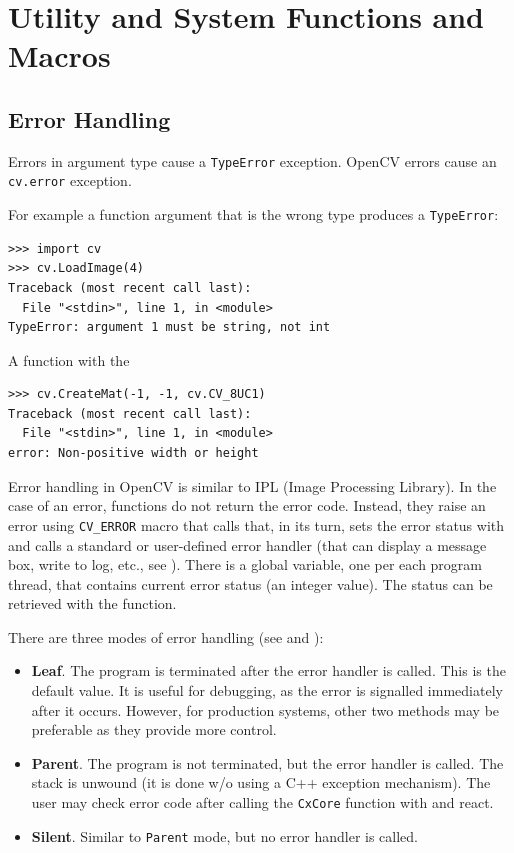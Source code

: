 \section{Utility and System Functions and Macros}

\ifCPy
\subsection{Error Handling}\label{Error handling}

\ifPy
Errors in argument type cause a \texttt{TypeError} exception.
OpenCV errors cause an \texttt{cv.error} exception.

For example a function argument that is the wrong type produces a \texttt{TypeError}:

\begin{lstlisting}
>>> import cv
>>> cv.LoadImage(4)
Traceback (most recent call last):
  File "<stdin>", line 1, in <module>
TypeError: argument 1 must be string, not int
\end{lstlisting}

A function with the 

\begin{lstlisting}
>>> cv.CreateMat(-1, -1, cv.CV_8UC1)
Traceback (most recent call last):
  File "<stdin>", line 1, in <module>
error: Non-positive width or height
\end{lstlisting}

\fi

\ifC %
Error handling in OpenCV is similar to IPL (Image Processing
Library). In the case of an error, functions do not return the error
code. Instead, they raise an error using \texttt{CV\_ERROR}
macro that calls  that, in its turn, sets the error
status with  and calls a standard or user-defined
error handler (that can display a message box, write to log, etc., see
).  There is a global variable, one per each program
thread, that contains current error status (an integer value). The status
can be retrieved with the  function.

There are three modes of error handling (see  and
):

\begin{itemize}
\item \textbf{Leaf}. The program is terminated after the error handler is
called. This is the default value. It is useful for debugging, as the
error is signalled immediately after it occurs. However, for production
systems, other two methods may be preferable as they provide more
control.
\item \textbf{Parent}. The program is not terminated, but the error handler
is called. The stack is unwound (it is done w/o using a C++ exception
mechanism). The user may check error code after calling the \texttt{CxCore} function with
 and react.
\item \textbf{Silent}. Similar to \texttt{Parent} mode, but no error handler
is called.
\end{itemize}


